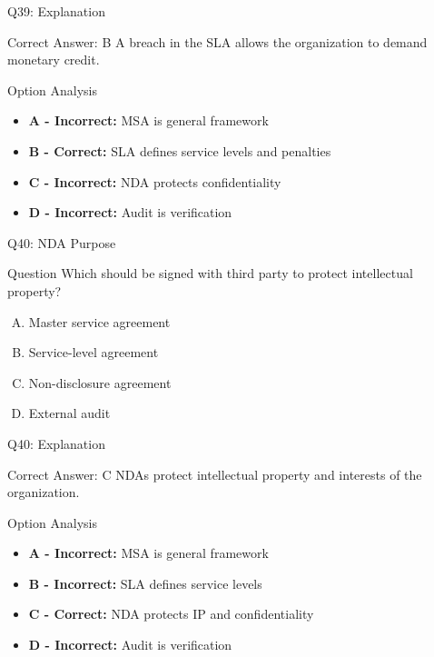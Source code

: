 \documentclass{beamer}
\begin{document}
	\begin{frame}{Q39: Explanation}
		\begin{block}{Correct Answer: B}
			A breach in the SLA allows the organization to demand monetary credit.
		\end{block}
		\begin{block}{Option Analysis}
			\begin{itemize}
				\item \textbf{A - Incorrect:} MSA is general framework
				\item \textbf{B - Correct:} SLA defines service levels and penalties
				\item \textbf{C - Incorrect:} NDA protects confidentiality
				\item \textbf{D - Incorrect:} Audit is verification
			\end{itemize}
		\end{block}
	\end{frame}
	
	\begin{frame}{Q40: NDA Purpose}
		\begin{block}{Question}
			Which should be signed with third party to protect intellectual property?
		\end{block}
		\begin{enumerate}[(A)]
			\item Master service agreement
			\item Service-level agreement
			\item Non-disclosure agreement
			\item External audit
		\end{enumerate}
	\end{frame}
	
	\begin{frame}{Q40: Explanation}
		\begin{block}{Correct Answer: C}
			NDAs protect intellectual property and interests of the organization.
		\end{block}
		\begin{block}{Option Analysis}
			\begin{itemize}
				\item \textbf{A - Incorrect:} MSA is general framework
				\item \textbf{B - Incorrect:} SLA defines service levels
				\item \textbf{C - Correct:} NDA protects IP and confidentiality
				\item \textbf{D - Incorrect:} Audit is verification
			\end{itemize}
		\end{block}
	\end{frame}
	
\end{document}
